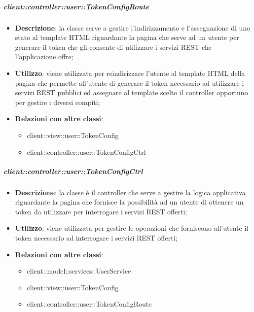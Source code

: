 		\subparagraph{client::controller::user::TokenConfigRoute} %
		\label{subp:bdsm_app_client_controller_user_tokenconfigroute}
			\begin{itemize}
				\item \textbf{Descrizione}: la classe serve a gestire l'indirizzamento e l'assegnazione di uno stato al template HTML riguardante la pagina che serve ad un utente per generare il token che gli consente di utilizzare i servizi REST che l'applicazione offre;
				\item \textbf{Utilizzo}: viene utilizzata per reindirizzare l'utente al template HTML della pagina che permette all'utente di generare il token necessario ad utilizzare i servizi REST pubblici ed assegnare al template scelto il controller opportuno per gestire i diversi compiti;
				\item \textbf{Relazioni con altre classi}:
					\begin{itemize}
						\item client::view::user::TokenConfig
						\item client::controller::user::TokenConfigCtrl
					\end{itemize}
			\end{itemize}

		\subparagraph{client::controller::user::TokenConfigCtrl} %
		\label{subp:client_controller_user_tokenconfigctrl}
			\begin{itemize}
				\item \textbf{Descrizione}: la classe è il controller che serve a gestire la logica applicativa riguardante la pagina che fornisce la possibilità ad un utente di ottenere un token da utilizzare per interrogare i servizi REST offerti;
				\item \textbf{Utilizzo}: viene utilizzata per gestire le operazioni che forniscono all'utente il token necessario ad interrogare i servizi REST offerti;
				\item \textbf{Relazioni con altre classi}:
					\begin{itemize}
						\item client::model::services::UserService
						\item client::view::user::TokenConfig
						\item client::controller::user::TokenConfigRoute
					\end{itemize}
			\end{itemize}


